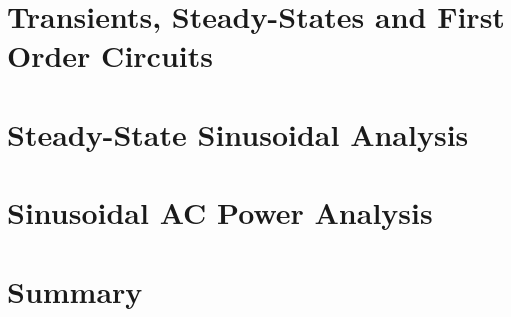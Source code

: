 \documentclass[12pt, letterpaper]{memoir}
\begin{document}
\chapter{Transients, Steady-States and First Order Circuits}

\chapter{Steady-State Sinusoidal Analysis}

\chapter{Sinusoidal AC Power Analysis}

\chapter{Summary}
\end{document}
